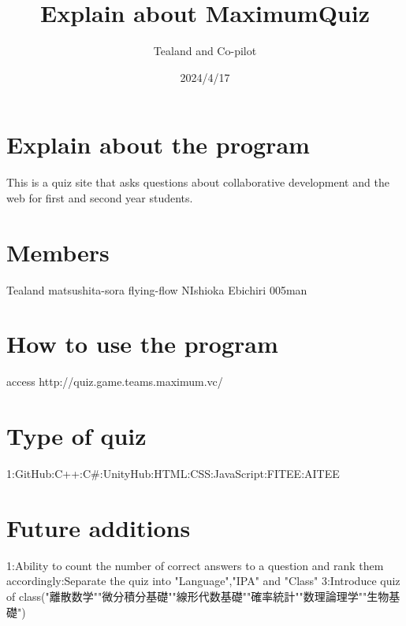 \documentclass{article}%
\title{Explain about MaximumQuiz}  %
\author{Tealand and Co-pilot}
\date{2024/4/17}
\begin{document}
\maketitle

\section{Explain about the program}

This is a quiz site that asks questions about collaborative development and the web for first and second year students.


\section{Members}

Tealand\newline
matsushita-sora\newline
flying-flow\newline
NIshioka\newline
Ebichiri\newline
005man\newline

\section{How to use the program}

access http://quiz.game.teams.maximum.vc/

\section{Type of quiz}

1:GitHub:C++:C#:UnityHub:HTML:CSS:JavaScript:FITEE:AITEE\newline

\section{Future additions}
1:Ability to count the number of correct answers to a question and rank them accordingly:Separate the quiz into "Language","IPA" and "Class" 
3:Introduce quiz of class("離散数学""微分積分基礎""線形代数基礎""確率統計""数理論理学""生物基礎")
\end{document}
